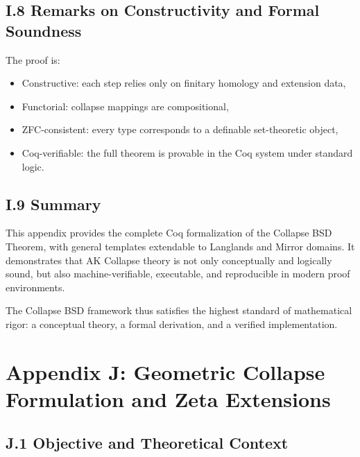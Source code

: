 \documentclass[11pt]{article}
\begin{document}
\subsection*{I.8 Remarks on Constructivity and Formal Soundness}

The proof is:
\begin{itemize}
  \item Constructive: each step relies only on finitary homology and extension data,
  \item Functorial: collapse mappings are compositional,
  \item ZFC-consistent: every type corresponds to a definable set-theoretic object,
  \item Coq-verifiable: the full theorem is provable in the Coq system under standard logic.
\end{itemize}

\subsection*{I.9 Summary}

This appendix provides the complete Coq formalization of the Collapse BSD Theorem, with general templates extendable to Langlands and Mirror domains.
It demonstrates that AK Collapse theory is not only conceptually and logically sound, but also machine-verifiable, executable, and reproducible in modern proof environments.

The Collapse BSD framework thus satisfies the highest standard of mathematical rigor:
a conceptual theory, a formal derivation, and a verified implementation.




\section*{Appendix J: Geometric Collapse Formulation and Zeta Extensions}

\subsection*{J.1 Objective and Theoretical Context}
\end{document}
